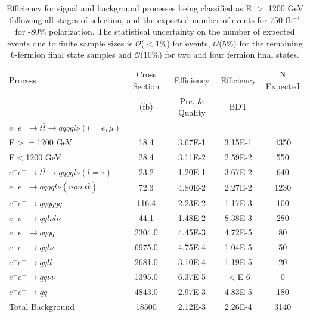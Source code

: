 \begin{table}
  \centering
  \begin{tabular}{l | c | c | c | c}
    \toprule
     Process     & Cross Section & Efficiency & Efficiency & N Expected\\
     & (fb) & Pre. \& Quality & BDT & \\
     \midrule
    $e^+e^-\rightarrow t\bar{t} \rightarrow qqqql\nu (l=e,\mu)$&  &  & &\\
     E$>=$1200 GeV & 18.4 & 3.67E-1 & 3.15E-1 & 4350\\
     E$<$1200 GeV & 28.4 & 3.11E-2 & 2.59E-2 & 550 \\
    \midrule
    $e^+e^-\rightarrow t\bar{t} \rightarrow qqqql\nu (l=\tau)$& 23.2 & 1.20E-1 & 3.67E-2 & 640 \\
    \midrule
    $e^+e^-\rightarrow qqqql\nu (non ~ t\bar{t})$& 72.3 & 4.80E-2 & 2.27E-2 & 1230\\
    \midrule
    $e^+e^-\rightarrow qqqqqq$ & 116.4 &  2.23E-2 &1.17E-3 & 100 \\
    \midrule
    $e^+e^-\rightarrow qql\nu l\nu$ & 44.1 & 1.48E-2 & 8.38E-3 & 280\\
    \midrule
    $e^+e^-\rightarrow qqqq$ & 2304.0 & 4.45E-3 & 4.72E-5 & 80 \\
    \midrule
    $e^+e^-\rightarrow qql\nu$ & 6975.0 & 4.75E-4 & 1.04E-5 & 50 \\
    \midrule
    $e^+e^-\rightarrow qqll$ & 2681.0 & 3.10E-4 & 1.19E-5 & 20 \\
    \midrule
    $e^+e^-\rightarrow qq\nu\nu$ & 1395.0 & 6.37E-5 & $<$E-6 & 0 \\
    \midrule
    $e^+e^-\rightarrow qq$ & 4843.0 & 2.97E-3 & 4.83E-5 & 180\\
    \midrule
    \midrule
    Total Background & 18500 & 2.12E-3 & 2.26E-4 & 3140 \\
    \bottomrule
  \end{tabular}
  \caption{Efficiency for signal and background processes being classified as E $>$ 1200 GeV following all stages of selection, and the expected number of events for 750 fb$^{-1}$ for -80\% polarization. The statistical uncertainty on the number of expected events due to finite sample sizes is $\mathcal{O}$($<$1\%) for \ttbar events, $\mathcal{O}$(5\%) for the remaining 6-fermion final state samples and $\mathcal{O}$(10\%) for two and four fermion final states.}
  \label{table:topfinalefficienciesneg}
\end{table}

